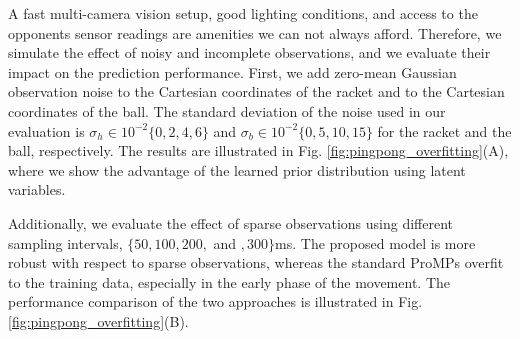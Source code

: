
A fast multi-camera vision setup, good lighting conditions, and access to the
opponents sensor readings are amenities we can not always afford. Therefore, we
simulate the effect of noisy and incomplete observations, and we evaluate their
impact on the prediction performance. First, we add zero-mean Gaussian
observation noise to the Cartesian coordinates of the racket and to the
Cartesian coordinates of the ball. The standard deviation of the noise used in
our evaluation is $\sigma_h \in 10^{-2}\{0, 2, 4, 6\}$ and $\sigma_b \in 10^{-2}\{0, 5, 10, 15\}$
for the racket and the ball, respectively. The results are illustrated in Fig. \ref{fig:pingpong_overfitting}(A), 
where we show the advantage of the learned prior distribution using latent
variables. %
  

Additionally, we evaluate the effect of sparse observations using different sampling
intervals, $\{50, 100, 200, $ and $, 300\}$ms. The proposed model is more robust
with respect to sparse observations, whereas the standard ProMPs overfit to the
training data, especially in the early phase of the movement. The performance
comparison of the two approaches is illustrated in Fig.
\ref{fig:pingpong_overfitting}(B).



